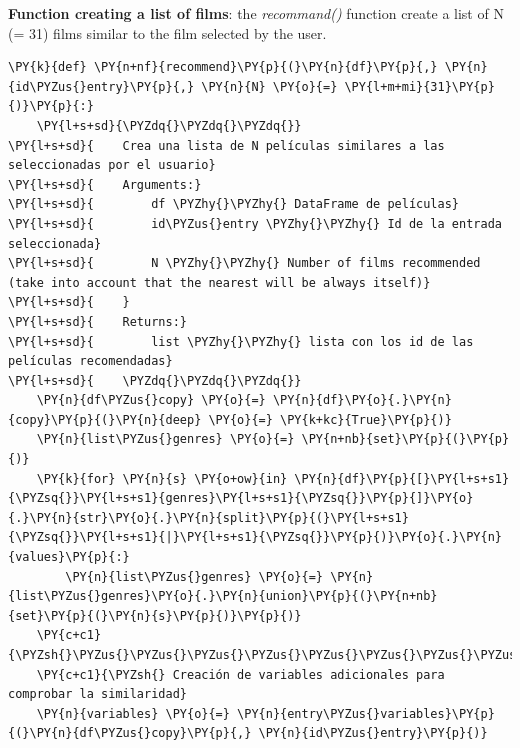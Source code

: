     \textbf{Function creating a list of films}: the \emph{recommand()}
function create a list of N (= 31) films similar to the film selected by
the user.

    \begin{tcolorbox}[breakable, size=fbox, boxrule=1pt, pad at break*=1mm,colback=cellbackground, colframe=cellborder]
\begin{Verbatim}[commandchars=\\\{\}]
\PY{k}{def} \PY{n+nf}{recommend}\PY{p}{(}\PY{n}{df}\PY{p}{,} \PY{n}{id\PYZus{}entry}\PY{p}{,} \PY{n}{N} \PY{o}{=} \PY{l+m+mi}{31}\PY{p}{)}\PY{p}{:}
    \PY{l+s+sd}{\PYZdq{}\PYZdq{}\PYZdq{}}
\PY{l+s+sd}{    Crea una lista de N películas similares a las seleccionadas por el usuario}
\PY{l+s+sd}{    Arguments:}
\PY{l+s+sd}{        df \PYZhy{}\PYZhy{} DataFrame de películas}
\PY{l+s+sd}{        id\PYZus{}entry \PYZhy{}\PYZhy{} Id de la entrada seleccionada}
\PY{l+s+sd}{        N \PYZhy{}\PYZhy{} Number of films recommended (take into account that the nearest will be always itself)}
\PY{l+s+sd}{    }
\PY{l+s+sd}{    Returns:}
\PY{l+s+sd}{        list \PYZhy{}\PYZhy{} lista con los id de las películas recomendadas}
\PY{l+s+sd}{    \PYZdq{}\PYZdq{}\PYZdq{}}
    \PY{n}{df\PYZus{}copy} \PY{o}{=} \PY{n}{df}\PY{o}{.}\PY{n}{copy}\PY{p}{(}\PY{n}{deep} \PY{o}{=} \PY{k+kc}{True}\PY{p}{)}    
    \PY{n}{list\PYZus{}genres} \PY{o}{=} \PY{n+nb}{set}\PY{p}{(}\PY{p}{)}
    \PY{k}{for} \PY{n}{s} \PY{o+ow}{in} \PY{n}{df}\PY{p}{[}\PY{l+s+s1}{\PYZsq{}}\PY{l+s+s1}{genres}\PY{l+s+s1}{\PYZsq{}}\PY{p}{]}\PY{o}{.}\PY{n}{str}\PY{o}{.}\PY{n}{split}\PY{p}{(}\PY{l+s+s1}{\PYZsq{}}\PY{l+s+s1}{|}\PY{l+s+s1}{\PYZsq{}}\PY{p}{)}\PY{o}{.}\PY{n}{values}\PY{p}{:}
        \PY{n}{list\PYZus{}genres} \PY{o}{=} \PY{n}{list\PYZus{}genres}\PY{o}{.}\PY{n}{union}\PY{p}{(}\PY{n+nb}{set}\PY{p}{(}\PY{n}{s}\PY{p}{)}\PY{p}{)}    
    \PY{c+c1}{\PYZsh{}\PYZus{}\PYZus{}\PYZus{}\PYZus{}\PYZus{}\PYZus{}\PYZus{}\PYZus{}\PYZus{}\PYZus{}\PYZus{}\PYZus{}\PYZus{}\PYZus{}\PYZus{}\PYZus{}\PYZus{}\PYZus{}\PYZus{}\PYZus{}\PYZus{}\PYZus{}\PYZus{}\PYZus{}\PYZus{}\PYZus{}\PYZus{}\PYZus{}\PYZus{}\PYZus{}\PYZus{}\PYZus{}\PYZus{}\PYZus{}\PYZus{}\PYZus{}\PYZus{}\PYZus{}\PYZus{}\PYZus{}\PYZus{}\PYZus{}\PYZus{}\PYZus{}\PYZus{}\PYZus{}\PYZus{}\PYZus{}\PYZus{}\PYZus{}\PYZus{}\PYZus{}\PYZus{}}
    \PY{c+c1}{\PYZsh{} Creación de variables adicionales para comprobar la similaridad}
    \PY{n}{variables} \PY{o}{=} \PY{n}{entry\PYZus{}variables}\PY{p}{(}\PY{n}{df\PYZus{}copy}\PY{p}{,} \PY{n}{id\PYZus{}entry}\PY{p}{)}

\end{Verbatim}
\end{tcolorbox}
